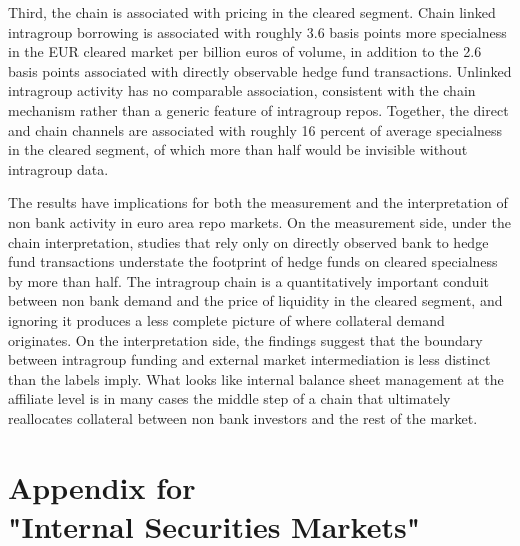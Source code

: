\documentclass[english, 11pt, oneside, legal]{article}
\renewcommand{\thesection}{\arabic{section}}
\renewcommand{\thesubsection}{\arabic{section}.\arabic{subsection}}
\begin{document}
Third, the chain is associated with pricing in the cleared segment. Chain linked intragroup borrowing is associated with roughly 3.6 basis points more specialness in the EUR cleared market per billion euros of volume, in addition to the 2.6 basis points associated with directly observable hedge fund transactions. Unlinked intragroup activity has no comparable association, consistent with the chain mechanism rather than a generic feature of intragroup repos. Together, the direct and chain channels are associated with roughly 16 percent of average specialness in the cleared segment, of which more than half would be invisible without intragroup data.

The results have implications for both the measurement and the interpretation of non bank activity in euro area repo markets. On the measurement side, under the chain interpretation, studies that rely only on directly observed bank to hedge fund transactions understate the footprint of hedge funds on cleared specialness by more than half. The intragroup chain is a quantitatively important conduit between non bank demand and the price of liquidity in the cleared segment, and ignoring it produces a less complete picture of where collateral demand originates. On the interpretation side, the findings suggest that the boundary between intragroup funding and external market intermediation is less distinct than the labels imply. What looks like internal balance sheet management at the affiliate level is in many cases the middle step of a chain that ultimately reallocates collateral between non bank investors and the rest of the market.


\clearpage
\singlespacing



\clearpage
\onehalfspacing
\section*{Appendix for \\
"Internal Securities Markets"}

\renewcommand{\thepage}{A -- \arabic{page}}
\setcounter{page}{1}

\setcounter{section}{0}
\setcounter{subsection}{0}

\renewcommand{\thesection}{\Alph{section}}
\renewcommand{\thesubsection}{\thesection\arabic{subsection}}

\setcounter{equation}{0}
\renewcommand{\theequation}{\thesection.\arabic{equation}}
\end{document}
